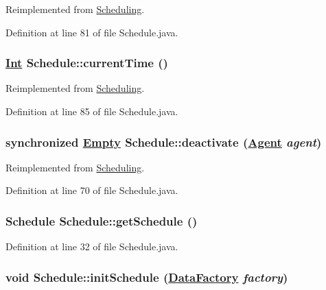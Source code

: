 Reimplemented from \hyperlink{interfaceScheduling_a4}{Scheduling}.

Definition at line 81 of file Schedule.java.\hypertarget{classSchedule_a5}{
\subsubsection[currentTime]{\setlength{\rightskip}{0pt plus 5cm}\hyperlink{interfaceInt}{Int} Schedule::current\-Time ()}}
\label{classSchedule_a5}




Reimplemented from \hyperlink{interfaceScheduling_a5}{Scheduling}.

Definition at line 85 of file Schedule.java.\hypertarget{classSchedule_a3}{
\subsubsection[deactivate]{\setlength{\rightskip}{0pt plus 5cm}synchronized \hyperlink{interfaceEmpty}{Empty} Schedule::deactivate (\hyperlink{interfaceAgent}{Agent} {\em agent})}}
\label{classSchedule_a3}




Reimplemented from \hyperlink{interfaceScheduling_a3}{Scheduling}.

Definition at line 70 of file Schedule.java.\hypertarget{classSchedule_d1}{
\subsubsection[getSchedule]{\setlength{\rightskip}{0pt plus 5cm}Schedule Schedule::get\-Schedule ()}}
\label{classSchedule_d1}




Definition at line 32 of file Schedule.java.\hypertarget{classSchedule_d0}{
\subsubsection[initSchedule]{\setlength{\rightskip}{0pt plus 5cm}void Schedule::init\-Schedule (\hyperlink{interfaceDataFactory}{Data\-Factory} {\em factory})}}
\label{classSchedule_d0}




